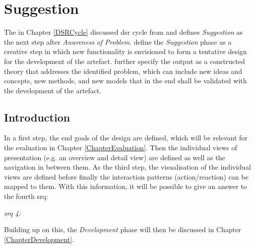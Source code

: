 
\chapter{Suggestion}

\label{ChapterSuggestion}

The in Chapter \ref{DSRCycle} discussed \gls{dsr} cycle from \cite{Vaishnavi2008} and \cite{Hevner2010} defines \textit{Suggestion} as the next step after \textit{Awareness of Problem}. \cite{Vaishnavi2008} define the \textit{Suggestion} phase as a creative step in which new functionality is envisioned to form a tentative design for the development of the artefact. \cite{Vaishnavi2008} further specify the output as a constructed theory that addresses the identified problem, which can include new ideas and concepts, new methods, and new models that in the end shall be validated with the development of the artefact.


\section{Introduction}

In a first step, the end goals of the design are defined, which will be relevant for the evaluation in Chapter \ref{ChapterEvaluation}. Then the individual views of presentation (e.g. an overview and detail view) are defined as well as the navigation in between them. As the third step, the visualisation of the individual views are defined before finally the interaction patterns (action/reaction) can be mapped to them. With this information, it will be possible to give an answer to the fourth \gls{srq}:
\begin{framed}
 	\textit{\gls{srq} 4: \srqfourtext}
\end{framed}
Building up on this, the \textit{Development} phase will then be discussed in Chapter \ref{ChapterDevelopment}.



